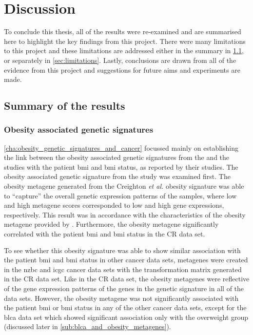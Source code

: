 \chapter{Discussion}
\label{cha:discussion}

To conclude this thesis, all of the results were re-examined and are summarised here to highlight the key findings from this project.
There were many limitations to this project and these limitations are addressed either in the summary in \cref{sec:summary_of_the_results}, or separately in \cref{sec:limitations}.
Lastly, conclusions are drawn from all of the evidence from this project and suggestions for future aims and experiments are made.


\section{Summary of the results}
\label{sec:summary_of_the_results}

\subsection{Obesity associated genetic signatures}
\label{sub:obesity_associated_genetic_signatures}

\cref{cha:obesity_genetic_signatures_and_cancer} focussed mainly on establishing the link between the obesity associated genetic signatures from the \citet{Creighton2012} and the \citet{Fuentes-Mattei2014} studies with the patient \gls{bmi} and \gls{bmi} status, as reported by their studies.
The obesity associated genetic signature from the \citet{Creighton2012} study was examined first.
The obesity metagene generated from the Creighton \textit{et al.} obesity signature  was able to ``capture'' the overall genetic expression patterns of the samples, where low and high metagene scores  corresponded to low and high gene expressions, respectively.
This result was in accordance with the characteristics of the obesity metagene provided by \citet{Creighton2012}.
Furthermore, the obesity metagene significantly correlated with the patient \gls{bmi} and \gls{bmi} status in the CR data set.

To see whether this obesity signature was able to show similar association with the patient \gls{bmi} and \gls{bmi} status in other cancer data sets, metagenes were created in the \gls{nzbc} and \gls{icgc} cancer data sets with the transformation matrix generated in the CR  data set.
Like in the CR  data set, the obesity metagenes were reflective of the gene expression patterns of the genes in the genetic signature in all of the data sets.
However, the obesity metagene was not significantly associated with the patient \gls{bmi} or \gls{bmi} status in any of the other cancer data sets, except for  the \gls{blca} data set which showed significant association only with the overweight group (discussed later in \cref{sub:blca_and_obesity_metagenes}).

